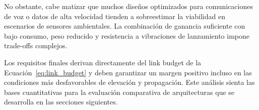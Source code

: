 No obstante, cabe matizar que muchos diseños optimizados para comunicaciones de voz o datos de alta velocidad tienden a sobreestimar la viabilidad en escenarios de sensores ambientales. La combinación de ganancia suficiente con bajo consumo, peso reducido y resistencia a vibraciones de lanzamiento impone trade-offs complejos. 

Los requisitos finales derivan directamente del link budget de la Ecuación~\ref{eq:link_budget} y deben garantizar un margen positivo incluso en las condiciones más desfavorables de elevación y propagación. Este análisis sienta las bases cuantitativas para la evaluación comparativa de arquitecturas que se desarrolla en las secciones siguientes.
